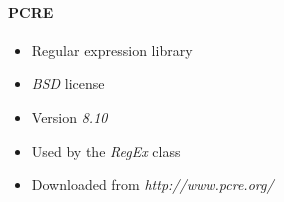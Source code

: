 \paragraph{PCRE}
\begin{itemize}
\item Regular expression library
\item \emph{BSD} license
\item Version \emph{8.10}
\item Used by the \emph{RegEx} class
\item Downloaded from \emph{http://www.pcre.org/}
\end{itemize}
